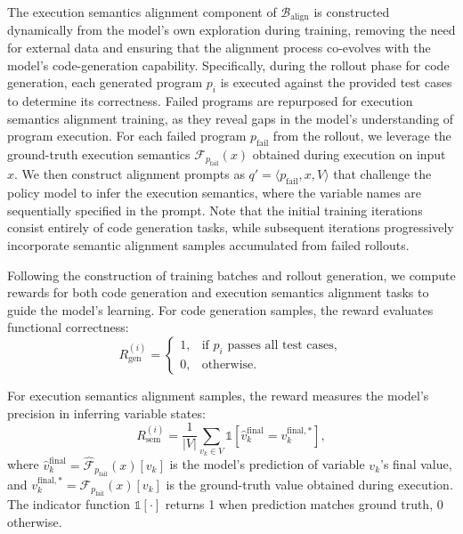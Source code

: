 \documentclass{article}
\theoremstyle{definition}
\theoremstyle{remark}
\newcounter{prompt}
\begin{document}
The execution semantics alignment component of $\mathcal{B}_{\text{align}}$ is constructed dynamically from the model's own exploration during training, removing the need for external data and ensuring that the alignment process co-evolves with the model’s code-generation capability.
Specifically, during the rollout phase for code generation, each generated program $p_i$ is executed against the provided test cases to determine its correctness. Failed programs are repurposed for execution semantics alignment training, as they reveal gaps in the model’s understanding of program execution.
For each failed program $p_{\text{fail}}$ from the rollout, we leverage the ground-truth execution semantics $\mathcal{F}_{p_{\text{fail}}}(x)$ obtained during execution on input $x$. We then construct alignment prompts as $q' = \langle p_{\text{fail}}, x, V \rangle$ that challenge the policy model to infer the execution semantics, where the variable names are sequentially specified in the prompt.
Note that the initial training iterations consist entirely of code generation tasks, while subsequent iterations progressively incorporate semantic alignment samples accumulated from failed rollouts.


Following the construction of training batches and rollout generation, we compute rewards for both code generation and execution semantics alignment tasks to guide the model's learning.
For code generation samples, the reward evaluates functional correctness:
\begin{equation}
R_{\text{gen}}^{(i)} = \begin{cases}
1, & \text{if } p_i \text{ passes all test cases}, \\
0, & \text{otherwise}.
\end{cases}
\end{equation}

For execution semantics alignment samples, the reward measures the model's precision in inferring variable states:
\begin{equation}
R_{\text{sem}}^{(i)} = \frac{1}{|V|} \sum_{v_k \in V} \mathbb{1}[\hat{v}_{k}^{\text{final}} = v_{k}^{\text{final},*}],
\end{equation}
where $\hat{v}_{k}^{\text{final}} = \hat{\mathcal{F}}_{p_{\text{fail}}}(x)[v_k]$ is the model's prediction of variable $v_k$'s final value, and $v_{k}^{\text{final},*} = \mathcal{F}_{p_{\text{fail}}}(x)[v_k]$ is the ground-truth value obtained during execution. The indicator function $\mathbb{1}[\cdot]$ returns 1 when prediction matches ground truth, 0 otherwise.
\end{document}
